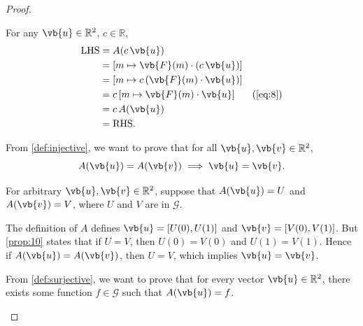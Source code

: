 \begin{enumerate}
\begin{enumerate}
\begin{proof}
                    \bigskip

                    \begin{subproof}
                        For any $\vb{u} \in \mathbb{R}^2$, $c \in \mathbb{R}$,
                        \begin{align*}
                            && \text{LHS} &= A(c \, \vb{u}) \\
                            && &= [m \mapsto \vb{F}(m) \cdot (c \, \vb{u})] \\
                            && &= [m \mapsto c \, (\vb{F}(m) \cdot \vb{u})] \\
                            && &= c \, [m \mapsto \vb{F}(m) \cdot \vb{u}] && \text{(\cref{eq:8})} \\
                            && &= c \, A(\vb{u}) \\
                            && &= \text{RHS}.
                        \end{align*}
                    \end{subproof}

                    \bigskip

                    \begin{subproof}
                        From \cref{def:injective}, we want to prove that for all $\vb{u}, \vb{v} \in \mathbb{R}^2$,
                        \[ A(\vb{u}) = A(\vb{v}) \implies \vb{u} = \vb{v}. \]

                        \smallskip

                        For arbitrary $\vb{u}, \vb{v} \in \mathbb{R}^2$, suppose that $A(\vb{u}) = U$ and $A(\vb{v}) = V$, where $U$ and $V$ are in $\mathscr{G}$.

                        The definition of $A$ defines $\vb{u} = [U(0), U(1)]$ and $\vb{v} = [V(0), V(1)]$.
                        But \cref{prop:10} states that if $U = V$, then $U(0) = V(0)$ and $U(1) = V(1)$.
                        Hence if $A(\vb{u}) = A(\vb{v})$, then $U = V$, which implies $\vb{u} = \vb{v}$.
                    \end{subproof}

                    \bigskip

                    \begin{subproof}
                        From \cref{def:surjective}, we want to prove that for every vector $\vb{u} \in \mathbb{R}^2$, there exists some function $f \in \mathscr{G}$ such that $A(\vb{u}) = f$.

                        \smallskip


\end{subproof}
\end{proof}
\end{enumerate}
\end{enumerate}

